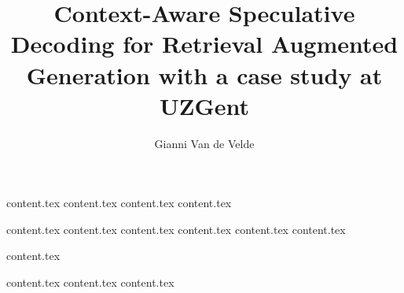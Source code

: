 \documentclass{report}
\title{\LARGE Context-Aware Speculative Decoding for Retrieval Augmented
Generation with a case study at UZGent}
\author{Gianni Van de Velde}
\begin{document}
    

    \newpage
    \newpage
    
    \titleformat{\chapter}{}{}{0em}{\bf\Huge}

    \afterpage{\blankpage}


    {content.tex}
    {content.tex}
    {content.tex}
    {content.tex}
    

    \tableofcontents


    
    \titleformat{\chapter}[display]{\normalfont\bfseries\Huge}{\chaptertitlename\ \thechapter}{1em}{\bf\Huge}

    \newpage

    {content.tex}
    {content.tex}
    {content.tex}
    {content.tex}
    {content.tex}
    {content.tex}

    {content.tex}

    \printbibliography

    \appendix
    {content.tex}
    {content.tex}
    {content.tex}

    \afterpage{\blankpage}

\end{document}
